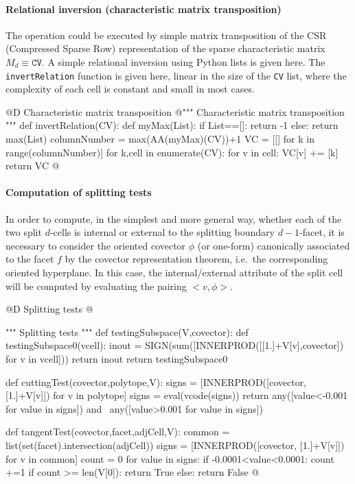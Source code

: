 \documentclass[11pt,oneside]{article}	%
\begin{document}
\paragraph{Relational inversion (characteristic matrix transposition)}

The operation could be executed by simple matrix transposition of the CSR (Compressed Sparse Row) representation of the sparse characteristic matrix $M_d \equiv \texttt{CV}$.
A simple relational inversion using Python lists is given here. The \texttt{invertRelation} function 
is given here, linear in the size of the \texttt{CV} list, where the complexity of each cell is constant and 
small in most cases.

@D Characteristic matrix transposition
@{""" Characteristic matrix transposition """
def invertRelation(CV):
	def myMax(List):
		if List==[]: return -1
		else: return max(List)
	columnNumber = max(AA(myMax)(CV))+1
	VC = [[] for k in range(columnNumber)]
	for k,cell in enumerate(CV):
		for v in cell:
			VC[v] += [k]
	return VC
@}


\paragraph{Computation of splitting tests}

In order to compute, in the simplest and more general way, whether each of the two split $d$-cells is internal or external to the splitting boundary $d-1$-facet, it is necessary to consider the oriented covector $\phi$ (or one-form) canonically associated to the facet $f$ by the covector representation theorem, i.e.~the corresponding oriented hyperplane. In this case, the internal/external attribute of the split cell will be computed by evaluating the pairing $<v,\phi>$.

@D Splitting tests
@{""" Splitting tests """
def testingSubspace(V,covector):
	def testingSubspace0(vcell):
		inout = SIGN(sum([INNERPROD([[1.]+V[v],covector]) for v in vcell]))
		return inout
	return testingSubspace0
	
def cuttingTest(covector,polytope,V):
	signs = [INNERPROD([covector, [1.]+V[v]]) for v in polytope]
	signs = eval(vcode(signs))
	return any([value<-0.001 for value in signs]) and \
			any([value>0.001 for value in signs])
	
def tangentTest(covector,facet,adjCell,V):
	common = list(set(facet).intersection(adjCell))
	signs = [INNERPROD([covector, [1.]+V[v]]) for v in common]
	count = 0
	for value in signs:
		if -0.0001<value<0.0001: count +=1
	if count >= len(V[0]): 
		return True
	else: 
		return False	
@}
\end{document}
